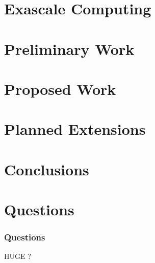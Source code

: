 \documentclass{beamer}
\begin{document}
\section{Exascale Computing}


\begin{frame}
  \frametitle{}

\end{frame}


\section{Preliminary Work}


\begin{frame}
  \frametitle{}

\end{frame}


\section{Proposed Work}


\begin{frame}
  \frametitle{}

\end{frame}


\section{Planned Extensions}


\begin{frame}
  \frametitle{}

\end{frame}


\section{Conclusions}


\begin{frame}
  \frametitle{}

\end{frame}


\section{Questions}


\begin{frame}
  \frametitle{Questions}

  \begin{center}
  {HUGE ? }
  \end{center}
\end{frame}
\end{document}

